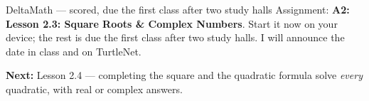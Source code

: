 \documentclass[aspectratio=169, 11pt]{beamer}
\begin{document}
\begin{frame}[t, plain]
  \begin{block}{DeltaMath --- scored, due the first class after two study halls}
    Assignment: \textbf{A2: Lesson 2.3: Square Roots \& Complex Numbers}. Start it now on your device; the
    rest is due the first class after two study halls. I will announce the date in class and on
    TurtleNet.
  \end{block}
  \vspace{6pt}
  \textbf{Next:} Lesson 2.4 --- completing the square and the quadratic formula solve
  \emph{every} quadratic, with real or complex answers.
\end{frame}
\end{document}
